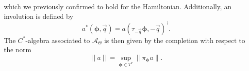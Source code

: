 \documentclass[
    aps,
    prb,
    twocolumn,
    floatfix,
    superscriptaddress,
	10pt
]{revtex4-2}
\begin{document}
which we previously confirmed to hold for the Hamiltonian.
Additionally, an involution is defined by
\begin{equation}
	a^\ast( \boldsymbol{\phi}, \vec{q})
	= a( \tau_{-\vec{q}} \boldsymbol{\phi}, -\vec{q})^\dagger .
\end{equation}
The $C^\ast$-algebra associated to $\mathcal{A}_{\Theta}$ is then given by the completion with respect to the norm 
\begin{equation}
	\| a \| = \sup\limits_{ \boldsymbol{\phi} \in T^r} \| \pi_{\boldsymbol{\phi}} a \| .
\end{equation}



\end{document}
